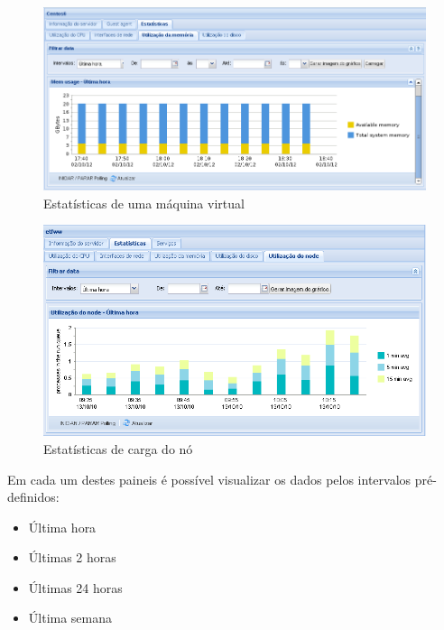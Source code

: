 \begin{figure}[H]
	\begin{center}
	\includegraphics[scale=0.45]{screenshots/server_stats_memUsage.png}
	\caption{Estatísticas de uma máquina virtual}
	\label{fig:server_stats_memUsage}
	\end{center}
\end{figure}

\begin{figure}[H]
	\begin{center}
	\includegraphics[scale=0.45]{screenshots/server_stats_nodeLoad.png}
	\caption{Estatísticas de carga do nó}
	\label{fig:server_stats_nodeLoad}
	\end{center}
\end{figure}

Em cada um destes paineis é possível visualizar os dados pelos intervalos pré-definidos:
\begin{itemize}
	\item Última hora
	\item Últimas 2 horas
	\item Últimas 24 horas
	\item Última semana
\end{itemize}

